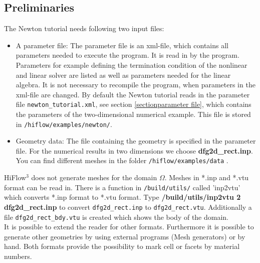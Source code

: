 \documentclass[a4paper, 11pt, twoside]{article}
\begin{document}
\subsection{Preliminaries}
The Newton tutorial needs following two input files:
\begin{itemize}
\item A parameter file: The parameter file is an xml-file, which contains all parameters needed to execute the program. It is read in by the program. Parameters for example defining the termination condition of the nonlinear and linear solver are listed as well as parameters needed for the linear algebra. It is not necessary to recompile the program, when parameters in the xml-file are changed. By default the Newton tutorial reads in the parameter file \verb+newton_tutorial.xml+, see section \ref{sectionparameter file}, which contains the parameters of the two-dimensional numerical example. This file is stored in \verb'/hiflow/examples/newton/'. 
\item Geometry data: The file containing the geometry is specified in the parameter file. For the numerical results in two dimensions we choose \textbf{dfg2d\_rect.inp}. You can find different meshes in the folder \verb'/hiflow/examples/data' .
\end{itemize}

HiFlow$^3$ does not generate meshes for the domain $\Omega$. Meshes in *.inp and *.vtu format can be read in. There is a function in \verb'/build/utils/' called 'inp2vtu' which converts *.inp format to *.vtu format. Type \textbf{/build/utils/inp2vtu 2 dfg2d\_rect.inp} to convert \verb+dfg2d_rect.inp+ to \verb+dfg2d_rect.vtu+. Additionally a file \verb+dfg2d_rect_bdy.vtu+ is created which shows the body of the domain.\\
It is possible to extend the reader for other formats.
Furthermore it is possible to generate other geometries by using external programs (Mesh generators) or by hand. 
Both formats provide the possibility to mark cell or facets by material numbers.\\ 
\end{document}
